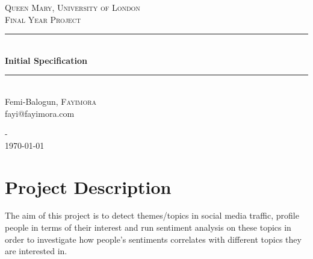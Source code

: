 \documentclass[12pt, a4paper]{article}
\begin{document}
\begin{titlepage}

\newcommand{\HRule}{\rule{\linewidth}{1mm}}
\center%


\textsc{\LARGE Queen Mary, University of London}\\[1.5cm]
\textsc{\large Final Year Project}\\[0.5cm]


\HRule\\[0.4cm]
{\huge \bfseries Initial Specification}\\[0.4cm] %
\HRule\\[1.5cm]

Femi-Balogun, \textsc{Fayimora}\\[0.2cm]
fayi@fayimora.com

\vfill

-\\
{\large \today}\\[3cm]

\end{titlepage}

\tableofcontents
\newpage


\section{Project Description}
The aim of this project is to detect themes/topics in social media traffic, profile people in terms
of their interest and run sentiment analysis on these topics in order to investigate how people's
sentiments correlates with different topics they are interested in.
\end{document}

